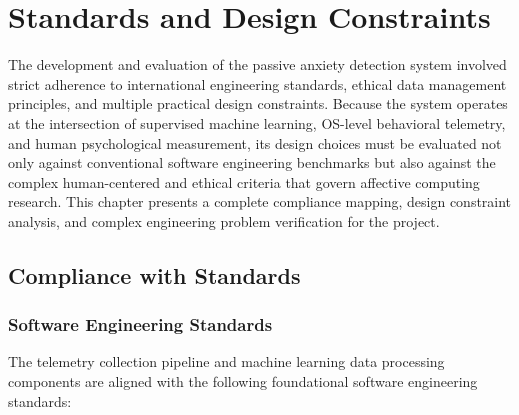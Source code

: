 \chapter[Standards \& Constraints]{Standards and Design Constraints}
\label{ch:standards_and_design_constraints}

The development and evaluation of the passive anxiety detection system involved strict adherence to international engineering standards, ethical data management principles, and multiple practical design constraints. Because the system operates at the intersection of supervised machine learning, OS-level behavioral telemetry, and human psychological measurement, its design choices must be evaluated not only against conventional software engineering benchmarks but also against the complex human-centered and ethical criteria that govern affective computing research. This chapter presents a complete compliance mapping, design constraint analysis, and complex engineering problem verification for the project.

\section{Compliance with Standards}
\label{sec:standards}

\subsection{Software Engineering Standards}
The telemetry collection pipeline and machine learning data processing components are aligned with the following foundational software engineering standards:

